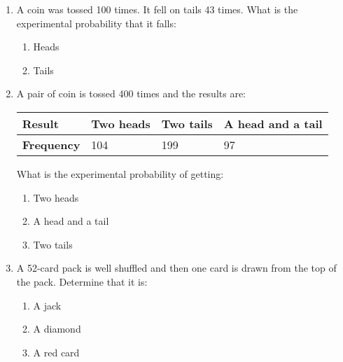 \begin{enumerate}[label = \arabic*. ]
\item A coin was tossed 100 times. It fell on tails 43 times. What is the experimental probability that it falls: 
\begin{enumerate}[label = \alph*. ]
\item \hspce  Heads
\item \hspce  Tails
\end{enumerate}   
\item A pair of coin is tossed 400 times and the results are:

\begin{center}
\noindent\begin{minipage}{\textwidth}
\begin{tabularx}{\textwidth}{|Y|Y|Y|Y|}
\hline
\textbf{Result} & Two heads & Two tails & A head and a tail\\
\hline
\textbf{Frequency} & 104 & 199 & 97\\
\hline
\end{tabularx} 
\end{minipage}
\end{center} 

What is the experimental probability of getting: 
\begin{enumerate}[label = \alph*. ]
\item \hspce  Two heads 
\item \hspce  A head and a tail
\item \hspce  Two tails
\end{enumerate} 

\item A 52-card pack is well shuffled and then one card is drawn from the top of the pack. Determine that it is: 
\begin{enumerate}[label = \alph*. ]
\item \hspce  A jack
\item  \hspce A diamond
\item \hspce  A red card
\end{enumerate} 

\end{enumerate}  

